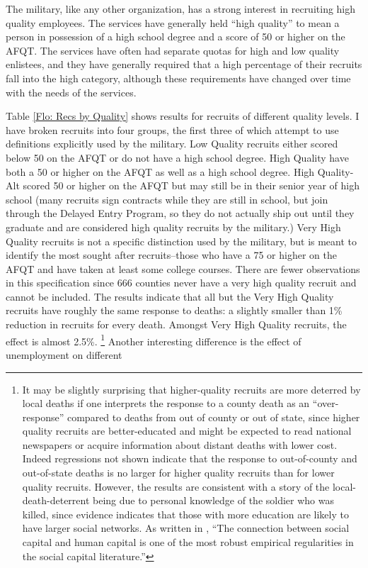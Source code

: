 \documentclass[12pt] {article}
\begin{document}
The military, like any other organization, has a strong interest in
recruiting high quality employees. The services have generally held {}``high
quality'' to mean a person in possession of a high school degree
and a score of 50 or higher on the AFQT. The services have often had
separate quotas for high and low quality enlistees, and they have
generally required that a high percentage of their recruits fall into
the high category, although these requirements have changed over time
with the needs of the services. 

Table \ref{Flo: Recs by Quality} shows results for recruits
of different quality levels. I have broken recruits into four groups, the first three of which attempt to use definitions explicitly used by the military.
Low Quality recruits either scored below 50 on the AFQT or do not
have a high school degree. High Quality have both a 50 or higher on
the AFQT as well as a high school degree. High Quality-Alt scored
50 or higher on the AFQT but may still be in their senior year of
high school (many recruits sign contracts while they are still in
school, but join through the Delayed Entry Program, so they do not
actually ship out until they graduate and are considered high quality
recruits by the military.) Very High Quality recruits is not a specific
distinction used by the military, but is meant to identify the most
sought after recruits--those who have a 75 or higher on the AFQT and
have taken at least some college courses. There are fewer observations in this specification since 666 counties never have a very high quality recruit and cannot be included. The results indicate that all but the Very High Quality recruits have roughly the same response
to deaths: a slightly smaller than 1\% reduction in recruits for every
death. Amongst Very High Quality recruits, the effect is almost 2.5\%.%
\footnote{It may be slightly surprising that higher-quality recruits are more
deterred by local deaths if one interprets the response to a county
death as an {}``over-response'' compared to deaths from out of county
or out of state, since higher quality recruits are better-educated
and might be expected to read national newspapers or acquire information
about distant deaths with lower cost. Indeed regressions not shown
indicate that the response to out-of-county and out-of-state deaths
is no larger for higher quality recruits than for lower quality recruits.
However, the results are consistent with a story of the local-death-deterrent
being due to personal knowledge of the soldier who was killed, since
evidence indicates that those with more education are likely to have
larger social networks. As written in \cite{GlaeserSocialNetworks},
{}``The connection between social capital and human capital is one
of the most robust empirical regularities in the social capital literature.'' %
} Another interesting difference is the effect of unemployment on different
\end{document}
